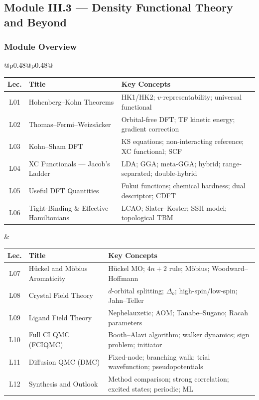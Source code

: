 \documentclass[11pt,a4paper]{article}
\begin{document}
\subsection{Module III.3 --- Density Functional Theory and Beyond}
\label{sec:mod-III3}

\subsubsection*{Module Overview}

\begin{center}
\begin{tabular}{@{}p{}@{\textwidth}p{}@{}}
\begin{tabular}[t]{@{}clp{4.5cm}@{}}
\toprule
\textbf{Lec.} & \textbf{Title} & \textbf{Key Concepts}\\
\midrule
L01 & Hohenberg--Kohn Theorems & HK1/HK2; $v$-representability; universal functional\\
L02 & Thomas--Fermi--Weizs\"acker & Orbital-free DFT; TF kinetic energy; gradient correction\\
L03 & Kohn--Sham DFT & KS equations; non-interacting reference; XC functional; SCF\\
L04 & XC Functionals --- Jacob's Ladder & LDA; GGA; meta-GGA; hybrid; range-separated; double-hybrid\\
L05 & Useful DFT Quantities & Fukui functions; chemical hardness; dual descriptor; CDFT\\
L06 & Tight-Binding \& Effective Hamiltonians & LCAO; Slater--Koster; SSH model; topological TBM\\
\bottomrule
\end{tabular}
&
\begin{tabular}[t]{@{}clp{4.5cm}@{}}
\toprule
\textbf{Lec.} & \textbf{Title} & \textbf{Key Concepts}\\
\midrule
L07 & H\"uckel and M\"obius Aromaticity & H\"uckel MO; $4n+2$ rule; M\"obius; Woodward--Hoffmann\\
L08 & Crystal Field Theory & $d$-orbital splitting; $\Delta_o$; high-spin/low-spin; Jahn--Teller\\
L09 & Ligand Field Theory & Nephelauxetic; AOM; Tanabe--Sugano; Racah parameters\\
L10 & Full CI QMC (FCIQMC) & Booth--Alavi algorithm; walker dynamics; sign problem; initiator\\
L11 & Diffusion QMC (DMC) & Fixed-node; branching walk; trial wavefunction; pseudopotentials\\
L12 & Synthesis and Outlook & Method comparison; strong correlation; excited states; periodic; ML\\
\bottomrule
\end{tabular}
\\
\end{tabular}
\end{center}
\end{document}
